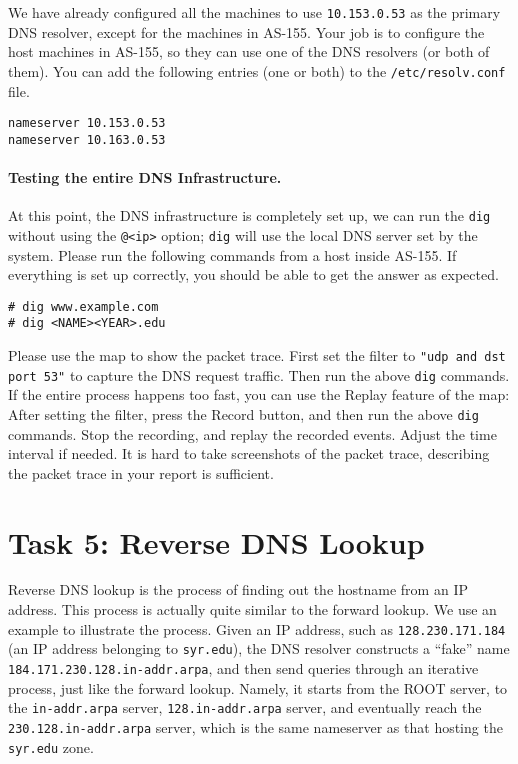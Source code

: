 We have already configured all the machines to use \texttt{10.153.0.53} 
as the primary DNS resolver, except for the machines in AS-155. Your job is to
configure the host machines in AS-155, so they can use one 
of the DNS resolvers (or both of them).
You can add the following entries (one or both) to the 
\texttt{/etc/resolv.conf} file.

\begin{lstlisting}
nameserver 10.153.0.53
nameserver 10.163.0.53
\end{lstlisting}


\paragraph{Testing the entire DNS Infrastructure.} 
At this point, the DNS infrastructure is completely set up,
we can run the \texttt{dig} without using the \texttt{@<ip>} option; 
\texttt{dig} will use the local DNS server set by the system. Please 
run the following commands from a host inside AS-155. If everything 
is set up correctly, you should be able to get the answer as expected. 


\begin{lstlisting}
# dig www.example.com
# dig <NAME><YEAR>.edu 
\end{lstlisting}

Please use the map to show the packet trace. 
First set the filter to \texttt{"udp and dst port 53"} 
to capture the DNS request traffic. Then run the above
\texttt{dig} commands. If the entire process happens too fast, you can
use the Replay feature of the map: After setting the 
filter, press the Record button, and then run the above \texttt{dig}
commands. Stop the recording, and replay the recorded events.
Adjust the time interval if needed. 
It is hard to take screenshots of the packet trace, 
describing the packet trace in your report is sufficient. 




\section{Task 5: Reverse DNS Lookup} 

Reverse DNS lookup is the process of finding out the hostname 
from an IP address. 
This process is actually quite similar to the forward lookup. 
We use an example to illustrate the process. Given an IP address,
such as \texttt{128.230.171.184} (an IP address belonging to
\texttt{syr.edu}), the DNS resolver constructs a ``fake''
name \texttt{184.171.230.128.in-addr.arpa}, and then send queries through an
iterative process, just like the forward lookup. Namely, it starts from the
ROOT server, to the \texttt{in-addr.arpa} server, \texttt{128.in-addr.arpa} server,
and eventually reach the \texttt{230.128.in-addr.arpa} server, which is the
same nameserver as that hosting the \texttt{syr.edu} zone. 

